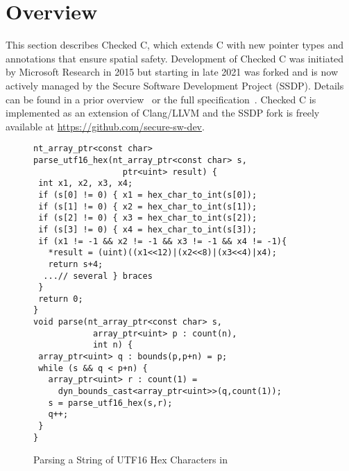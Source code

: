 \section{\checkedc Overview}\label{sec:overview}

This section describes Checked C, which extends C with new pointer
types and annotations that ensure spatial safety. Development of
Checked C was initiated by Microsoft Research in 2015 but starting in
late 2021 was forked and is now actively managed by the Secure Software
Development Project (SSDP). Details can be found in a prior
overview~\cite{Elliott2018} or the full specification~\cite{checkedc}.
Checked C is implemented as an extension of Clang/LLVM and the SSDP
fork is freely available at \url{https://github.com/secure-sw-dev}. 

\begin{figure}[t]
{\small
  \begin{lstlisting}[xleftmargin=4 mm]
nt_array_ptr<const char>
parse_utf16_hex(nt_array_ptr<const char> s,
                  ptr<uint> result) {
 int x1, x2, x3, x4;
 if (s[0] != 0) { x1 = hex_char_to_int(s[0]);
 if (s[1] != 0) { x2 = hex_char_to_int(s[1]);
 if (s[2] != 0) { x3 = hex_char_to_int(s[2]);
 if (s[3] != 0) { x4 = hex_char_to_int(s[3]);
 if (x1 != -1 && x2 != -1 && x3 != -1 && x4 != -1){
   *result = (uint)((x1<<12)|(x2<<8)|(x3<<4)|x4);
   return s+4;
  ...// several } braces
 } 
 return 0;
}
void parse(nt_array_ptr<const char> s,
            array_ptr<uint> p : count(n), 
            int n) {
 array_ptr<uint> q : bounds(p,p+n) = p;
 while (s && q < p+n) {
   array_ptr<uint> r : count(1) =
     dyn_bounds_cast<array_ptr<uint>>(q,count(1));
   s = parse_utf16_hex(s,r);
   q++;
 }
}
  \end{lstlisting}

}

\caption{Parsing a String of UTF16 Hex Characters in \checkedc}
\label{fig:checkedc-example}
\end{figure}

